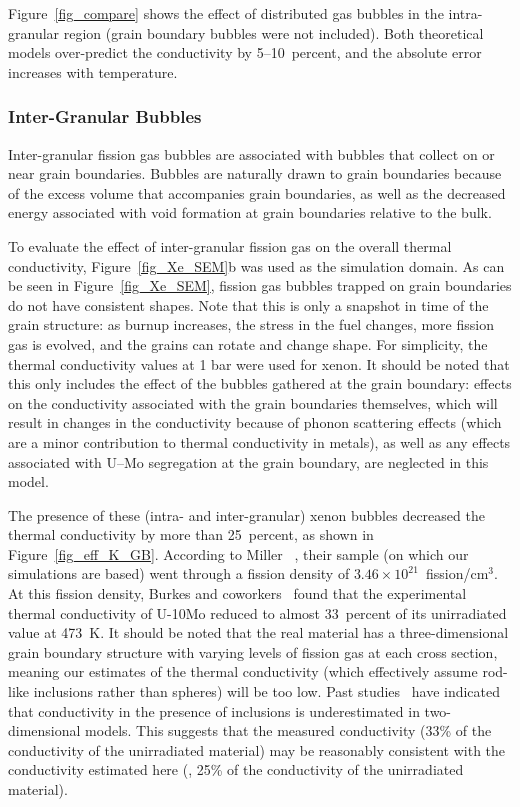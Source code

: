 Figure~\ref{fig_compare} shows the effect of distributed gas bubbles in the intra-granular region (grain boundary bubbles were not included). Both theoretical models over-predict the conductivity by 5--10~percent, and the absolute error increases with temperature.

\subsubsection{Inter-Granular Bubbles}
Inter-granular fission gas bubbles are associated with bubbles that collect on
or near grain boundaries. Bubbles are naturally drawn to grain boundaries
because of the excess volume that accompanies grain boundaries, as well as
the decreased energy associated with void formation at grain boundaries
relative to the bulk.

To evaluate the effect of inter-granular fission gas on the overall thermal conductivity, Figure~\ref{fig_Xe_SEM}b was used as the simulation domain. As can be seen in Figure~\ref{fig_Xe_SEM}, fission gas bubbles trapped on grain boundaries do not have consistent shapes. Note that this is only a snapshot in time of the grain structure: as burnup increases, the stress in the fuel changes, more fission gas is evolved, and the grains can rotate and change shape. For simplicity, the thermal conductivity values at 1 bar were used for xenon. 
It should be noted that this only includes the effect of the bubbles gathered
at the grain boundary: effects on the conductivity associated with the grain
boundaries themselves, which will result in changes in the conductivity
because of phonon scattering effects (which are a minor contribution to thermal
conductivity in metals), as well as any effects associated with U--Mo
segregation at the grain boundary, are neglected in this model.

The presence of these (intra- and inter-granular) xenon bubbles decreased the thermal conductivity by more than 25~percent, as shown in Figure~\ref{fig_eff_K_GB}. According to Miller \etal~\cite{miller2012advantages},
their sample (on which our simulations are based) went through a fission density of $3.46\times10^{21}$~fission/cm$^{3}$. At this fission density, Burkes and coworkers~\cite{burkes2015thermal} found that the experimental thermal conductivity of \mbox{U-10Mo} reduced to almost 33~percent of its unirradiated value at 473~K\@. It should
be noted that the real material has a three-dimensional grain boundary structure with varying levels of fission gas at each cross section, meaning our estimates of the thermal conductivity (which effectively assume rod-like inclusions rather than spheres) will be too low. Past
studies~\cite{bakker1997using,Schulz1981} have indicated that
conductivity in the presence of inclusions is underestimated in two-dimensional
models. This suggests that the measured conductivity (33\% of the
conductivity of the unirradiated material) may be reasonably consistent with the conductivity estimated here (\ie, 25\% of the conductivity of the unirradiated material).

